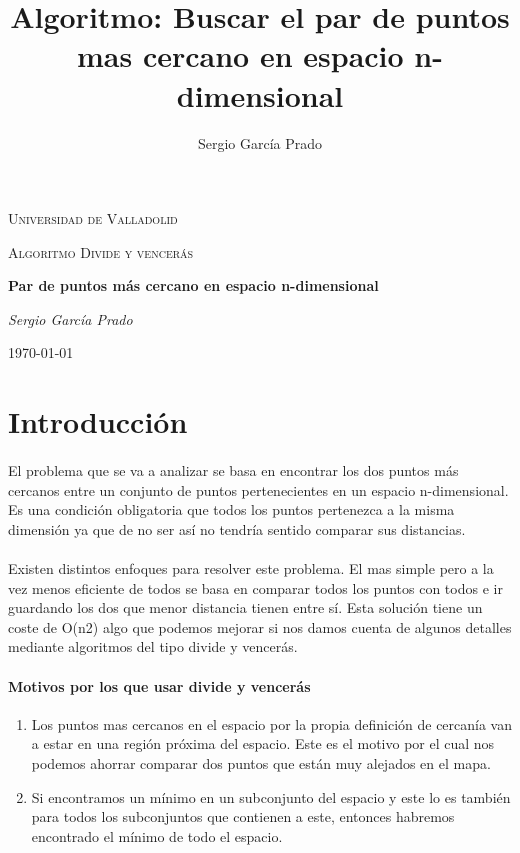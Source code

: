 \documentclass{article}
\title{Algoritmo: Buscar el par de puntos mas cercano en espacio n-dimensional}
\author{Sergio García Prado}
\begin{document}
\begin{titlepage}
	\centering
	{\scshape\LARGE Universidad de Valladolid \par}
	\vspace{1cm}
	{\scshape\Large Algoritmo Divide y vencerás\par}
	\vspace{1.5cm}
	{\huge\bfseries Par de puntos más cercano en espacio n-dimensional\par}
	\vspace{2cm}
	{\Large\itshape Sergio García Prado\par}


	{\large \today\par}
\end{titlepage}

\section{Introducción}

	\paragraph{}
	El problema que se va a analizar se basa en encontrar los dos puntos más cercanos entre un conjunto de puntos pertenecientes en un espacio n-dimensional. Es una condición obligatoria que todos los puntos pertenezca a la misma dimensión ya que de no ser así no tendría sentido comparar sus distancias.

	\paragraph{}
	Existen distintos enfoques para resolver este problema. El mas simple pero a la vez menos eficiente de todos se basa en comparar todos los puntos con todos e ir guardando los dos que menor distancia tienen entre sí. Esta solución tiene un coste de O(n2) algo que podemos mejorar si nos damos cuenta de algunos detalles mediante algoritmos del tipo divide y vencerás.

	\paragraph{Motivos por los que usar divide y vencerás}

		\begin{enumerate}

			\item
			Los puntos mas cercanos en el espacio por la propia definición de cercanía van a estar en una región próxima del espacio. Este es el motivo por el cual nos podemos ahorrar comparar dos puntos que están muy alejados en el mapa.
			\item
			Si encontramos un mínimo en un subconjunto del espacio y este lo es también para todos los subconjuntos que contienen a este, entonces habremos encontrado el mínimo de todo el espacio.

		\end{enumerate}
\end{document}
